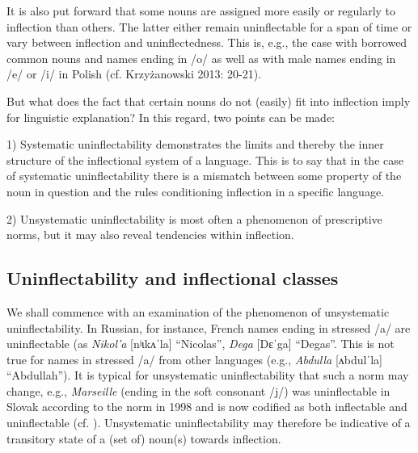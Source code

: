 \documentclass[output=paper]{langscibook}
\begin{document}
It is also put forward that some nouns are assigned more easily or regularly to inflection than others. The latter either remain uninflectable for a span of time or vary between inflection and uninflectedness. This is, e.g., the case with borrowed common nouns and names ending in /o/ as well as with male names ending in /e/ or /i/ in Polish (cf. Krzyżanowski 2013: 20-21).

But what does the fact that certain nouns do not (easily) fit into inflection imply for linguistic explanation? In this regard, two points can be made:

1) Systematic uninflectability demonstrates the limits and thereby the inner structure of the inflectional system of a language. This is to say that in the case of systematic uninflectability there is a mismatch between some property of the noun in question and the rules conditioning inflection in a specific language.

2) Unsystematic uninflectability is most often a phenomenon of prescriptive norms, but it may also reveal tendencies within inflection.

\subsection{Uninflectability and inflectional classes} %

We shall commence with an examination of the phenomenon of unsystematic uninflectability. In Russian, for instance, French names ending in stressed /a/ are uninflectable (as \textit{Nikol’a} [nʲɩkʌˈla] “Nicolas”, \textit{Dega} [Dɛˈga] “Degas”. This is not true for names in stressed /a/ from other languages (e.g., \textit{Abdulla} [ʌbdulˈla] “Abdullah”). It is typical for unsystematic uninflectability that such a norm may change, e.g., \textit{Marseille} (ending in the soft consonant /j/) was uninflectable in Slovak according to the norm in 1998 and is now codified as both inflectable and uninflectable (cf. \citealt{Považaj1998,Považaj2013}). Unsystematic uninflectability may therefore be indicative of a transitory state of a (set of) noun(s) towards inflection. 
\end{document}

